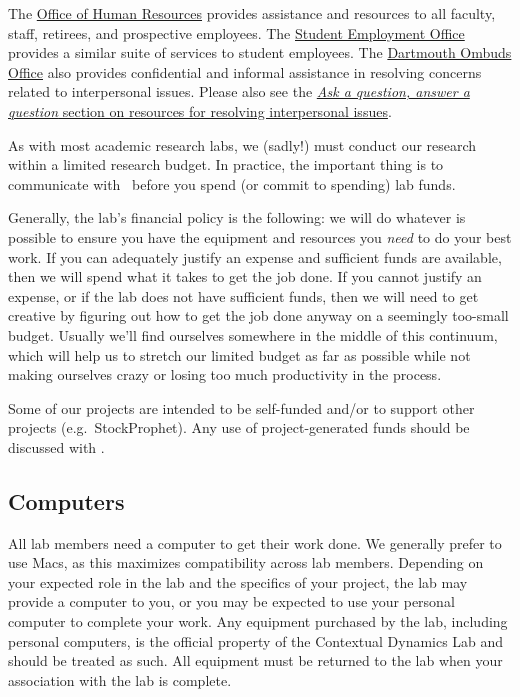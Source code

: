 \documentclass{tufte-book} %
\begin{document}
The \href{http://www.dartmouth.edu/~hrs/}{Office of Human Resources}
provides assistance and resources to all faculty, staff, retirees, and
prospective employees. The
\href{http://www.dartmouth.edu/~seo/}{Student Employment Office}
provides a similar suite of services to student employees.  The
\href{http://www.dartmouth.edu/~ombuds/}{Dartmouth Ombuds Office} also
provides confidential and informal assistance in resolving concerns
related to interpersonal issues.  Please also see the
\hyperref[sec:interpersonal]{\textit{Ask a question, answer a question} section on resources for resolving interpersonal issues}.



\noindent  As with most academic research labs, we (sadly!) must conduct our
 research within a limited research budget.  In practice, the
 important thing is to communicate with \director~before you spend (or
 commit to spending) lab funds.

 Generally, the lab's financial policy is the following: we will do
 whatever is possible to ensure you have the equipment and resources
 you \textit{need} to do your best work.  If you can adequately
 justify an expense and sufficient funds are available, then we will
 spend what it takes to get the job done.  If you cannot justify an
 expense, or if the lab does not have sufficient funds, then we will
 need to get creative by figuring out how to get the job done anyway
 on a seemingly too-small budget.  Usually we'll find ourselves
 somewhere in the middle of this continuum, which will help us to
 stretch our limited budget as far as possible while not making
 ourselves crazy or losing too much productivity in the process.

 Some of our projects are intended to be self-funded and/or to support
 other projects (e.g.\ StockProphet).  Any use of project-generated
 funds should be discussed with \director.

 \subsection{Computers}
All lab members need a computer to get their work done.  We generally
prefer to use Macs, as this maximizes compatibility across lab
members.  Depending on your expected role in the lab and the specifics
of your project, the lab may provide a computer to you, or you may be
expected to use your personal computer to complete your work.  Any
equipment purchased by the lab, including personal computers, is the
official property of the Contextual Dynamics Lab and should be treated
as such.  All equipment must be returned to the lab when your
association with the lab is complete.
\end{document}
